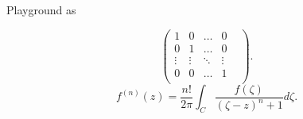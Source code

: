 \documentclass[class=article, crop=false]{standalone}
\begin{document}
\begin{zettel}{Playground}
    as

\[
    \begin{pmatrix}
    1       & 0       &  \dots  & 0 \\
    0       & 1       &  \dots  & 0 \\
     \vdots &  \vdots &  \ddots &  \vdots &  \\
    0       & 0       &  \dots  & 1 \\
    \end{pmatrix}
.\]
\[
f ^{(n)}(z) =  \frac{n!}{2 \pi } \int_{C}^{} \frac{f (\zeta)}{(\zeta-z)^n+1 } d \zeta
.\]





\end{zettel}
\end{document}
